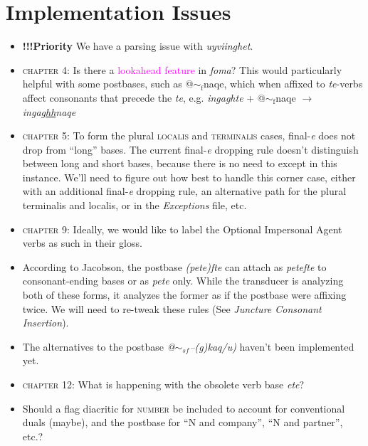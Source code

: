 \documentclass{article}
\begin{document}

\section{Implementation Issues}

\begin{itemize}
\renewcommand\labelitemi{$\cdot$}

\item \textbf{!!!Priority} We have a parsing issue with \textit{uyviinghet}.

\item \textsc{chapter 4}: Is there a \textcolor{magenta}{lookahead feature} in \textit{foma}? This would particularly helpful with some postbases, such as @${\sim}_\text{f}$naqe, which when affixed to \textit{te}-verbs affect consonants that precede the \textit{te}, e.g. \textit{ingaghte} + @${\sim}_\text{f}$naqe $\rightarrow$ \textit{inga\uline{ghh}naqe}

\item \textsc{chapter 5}: To form the plural \textsc{localis} and \textsc{terminalis} cases, final-\textit{e} does not drop from ``long'' bases.
%
The current final-\textit{e} dropping rule doesn't distinguish between long and short bases, because there is no need to except in this instance.
%
We'll need to figure out how best to handle this corner case, either with an additional final-\textit{e} dropping rule, an alternative path for the plural terminalis and localis, or in the \textit{Exceptions} file, etc.

\item \textsc{chapter 9}: Ideally, we would like to label the Optional Impersonal Agent verbs as such in their gloss.

\item According to Jacobson, the postbase \textit{(pete)fte} can attach as \textit{petefte} to consonant-ending bases or as \textit{pete} only.
%
While the transducer is analyzing both of these forms, it analyzes the former as if the postbase were affixing twice.
%
We will need to re-tweak these rules (See \textit{Juncture Consonant Insertion}).

\item The alternatives to the postbase \textit{@$\sim_{sf}$--(g)kaq/u)} haven't been implemented yet.

\item \textsc{chapter 12}: What is happening with the obsolete verb base \textit{ete}?

\item Should a flag diacritic for \textsc{number} be included to account for conventional duals (maybe), and the postbase for ``N and company'', ``N and partner'', etc.?


\end{itemize}
\end{document}
